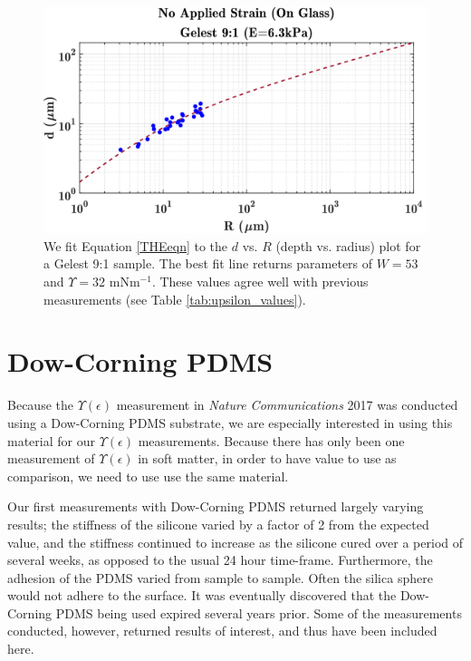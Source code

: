\begin{figure}[h!]
	\centering
	\includegraphics[width=\linewidth]{Chapters/Figures/w_ups_fit_G9-1}
	\caption[Gelest W-$\Upsilon$ Fit]{We fit Equation \ref{THEeqn} to the $ d $ vs. $ R $ (depth vs. radius) plot for a Gelest 9:1 sample. The best fit line returns parameters of $ W=53 $  and $ \Upsilon=32 $ mNm$^{-1}$. These values agree well with previous measurements (see Table \ref{tab:upsilon_values}).}
	\label{fig:wupsfitg9-1}
\end{figure}

\section{Dow-Corning PDMS}
Because the $ \Upsilon(\epsilon) $ measurement in \textit{Nature Communications} 2017 \cite{xu2017direct} was conducted using a Dow-Corning PDMS substrate, we are especially interested in using this material for our $ \Upsilon(\epsilon) $ measurements. Because there has only been one measurement of $ \Upsilon(\epsilon) $ in soft matter, in order to have value to use as comparison, we need to use use the same material. 

Our first measurements with Dow-Corning PDMS returned largely varying results; the stiffness of the silicone varied by a factor of 2 from the expected value, and the stiffness continued to increase as the silicone cured over a period of several weeks, as opposed to the usual 24 hour time-frame. Furthermore, the adhesion of the PDMS varied from sample to sample. Often the silica sphere would not adhere to the surface. It was eventually discovered that the Dow-Corning PDMS being used expired several years prior. Some of the measurements conducted, however, returned results of interest, and thus have been included here.


